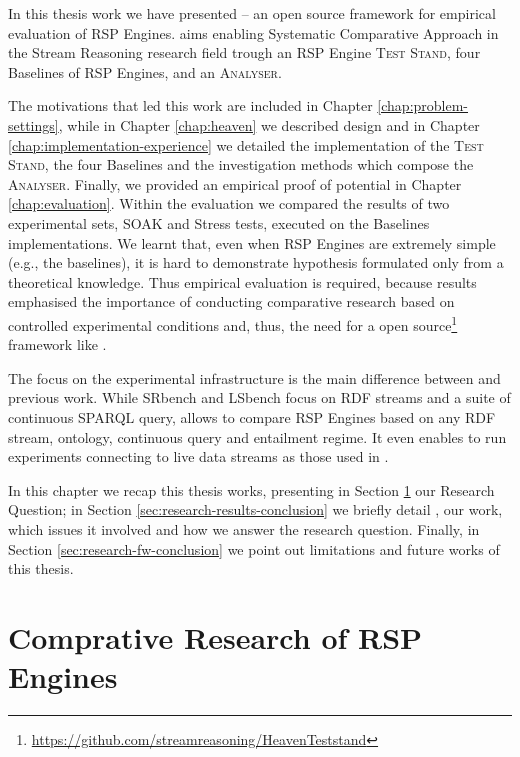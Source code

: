 In this thesis work we have presented \name -- an open source framework for empirical evaluation of RSP Engines. \name aims enabling Systematic Comparative Approach in the Stream Reasoning research field trough an RSP Engine \textsc{Test Stand}, four Baselines of RSP Engines, and an \textsc{Analyser}. 

The motivations that led this work are included in Chapter \ref{chap:problem-settings}, while in Chapter \ref{chap:heaven} we described \name design and in Chapter \ref{chap:implementation-experience} we detailed the implementation of the \textsc{Test Stand}, the four Baselines and the investigation methods which compose the \textsc{Analyser}. Finally, we provided an empirical proof of \name potential in Chapter \ref{chap:evaluation}. Within the evaluation we compared the results of two experimental sets, SOAK and Stress tests, executed on the Baselines implementations. We learnt that, even when RSP Engines are extremely simple (e.g., the baselines), it is hard to demonstrate hypothesis formulated only from a theoretical knowledge. Thus empirical evaluation is required, because results emphasised the importance of conducting comparative research based on controlled experimental conditions and, thus, the need for a open source\footnote{\url{https://github.com/streamreasoning/HeavenTeststand}} framework like \namens.

The focus on the experimental infrastructure is the main difference between \name and previous work. While SRbench and LSbench focus on RDF streams and a suite of continuous SPARQL query, \name allows to compare RSP Engines based on any RDF stream, ontology, continuous query and entailment regime. It even enables to run experiments connecting to live data streams as those used in \cite{DBLP:conf/semweb/BalduiniVDTPC13}.	

In this chapter we recap this thesis works, presenting in Section \ref{sec:research-question-conclusion} our Research Question; in Section \ref{sec:research-results-conclusion} we briefly detail \namens, our work, which issues it involved and how we answer the research question. Finally, in Section \ref{sec:research-fw-conclusion} we point out \name limitations and future works of this thesis.

\section{Comprative Research of RSP Engines}\label{sec:research-question-conclusion}

